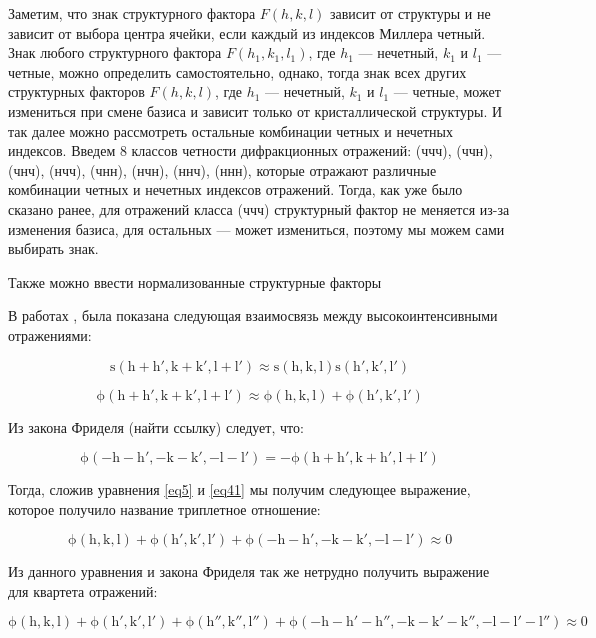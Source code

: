 Заметим, что знак структурного фактора $F(h,k,l)$ зависит от структуры и не зависит от выбора центра ячейки, если каждый из индексов Миллера четный. Знак любого структурного фактора $F(h_1,k_1,l_1)$, где $h_1$ --- нечетный, $k_1$ и $l_1$ --- четные, можно определить самостоятельно, однако, тогда знак всех других структурных факторов $F(h,k,l)$, где $h_1$ --- нечетный, $k_1$ и $l_1$ --- четные, может измениться при смене базиса и зависит только от кристаллической структуры. И так далее можно рассмотреть остальные комбинации четных и нечетных индексов. Введем 8 классов четности дифракционных отражений: (ччч), (ччн), (чнч), (нчч), (чнн), (нчн), (ннч), (ннн), которые отражают различные комбинации четных и нечетных индексов отражений. Тогда, как уже было сказано ранее, для отражений класса (ччч) структурный фактор не меняется из-за изменения базиса, для остальных --- может измениться, поэтому мы можем сами выбирать знак.

Также можно ввести нормализованные структурные факторы \cite{giacovazzo_direct_1998}


В работах \cite{sayre_squaring_1952}, \cite{cochran_relation_1952} была показана следующая взаимосвязь между высокоинтенсивными отражениями:

\begin{equation}\label{eq4}
\mathrm{ 
s(h+h', k+k', l+l') \approx s(h,k,l) s(h', k', l')}
\end{equation}


\begin{equation}\label{eq41}
\mathrm{
\phi(h+h', k+k', l+l')\approx \phi(h,k,l)+\phi(h',k',l')
}
\end{equation}

Из закона Фриделя (найти ссылку) следует, что:

\begin{equation}\label{eq5}
\mathrm{ 
\phi(-h-h',-k-k',-l-l') = -\phi(h+h', k+h', l+l')}
\end{equation}

Тогда, сложив уравнения \ref{eq5} и \ref{eq41} мы получим следующее выражение, которое получило название триплетное отношение:

\begin{equation}\label{eq6}
\mathrm{ 
\phi(h,k,l)+\phi(h',k',l') +\phi(-h-h',-k-k',-l-l')\approx 0}
\end{equation}

Из данного уравнения и закона Фриделя так же нетрудно получить выражение для квартета отражений:

\begin{equation}\label{eq7}
\mathrm{ 
\phi(h,k,l)+\phi(h',k',l') +\phi(h'',k'',l'')+\phi(-h-h'-h'',-k-k'-k'',-l-l'-l'')\approx 0}
\end{equation}

